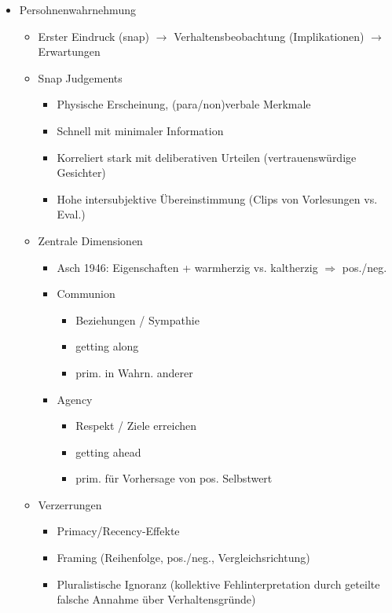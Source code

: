 \documentclass[11pt, paper=a4, twocolumn]{scrartcl}
\begin{document}
\begin{itemize}
			\item Persohnenwahrnehmung
				\begin{itemize}
					\item Erster Eindruck (snap) $\rightarrow$ Verhaltensbeobachtung (Implikationen) $\rightarrow$ Erwartungen
					\item Snap Judgements
						\begin{itemize}
							\item Physische Erscheinung, (para/non)verbale Merkmale
							\item Schnell mit minimaler Information
							\item Korreliert stark mit deliberativen Urteilen (vertrauenswürdige Gesichter)
							\item Hohe intersubjektive Übereinstimmung (Clips von Vorlesungen vs. Eval.)
						\end{itemize}
					\item Zentrale Dimensionen
						\begin{itemize}
							\item Asch 1946: Eigenschaften + warmherzig vs. kaltherzig $\Rightarrow$ pos./neg.
							\item Communion
								\begin{itemize}
									\item Beziehungen / Sympathie
									\item getting along
									\item prim. in Wahrn. anderer
								\end{itemize}
							\item Agency
								\begin{itemize}
									\item Respekt / Ziele erreichen
									\item getting ahead
									\item prim. für Vorhersage von pos. Selbstwert
								\end{itemize}
						\end{itemize}
					\item Verzerrungen
						\begin{itemize}
							\item Primacy/Recency-Effekte
							\item Framing (Reihenfolge, pos./neg., Vergleichsrichtung)
							\item Pluralistische Ignoranz (kollektive Fehlinterpretation durch geteilte falsche Annahme über 
								Verhaltensgründe)\\

\end{itemize}
\end{itemize}
\end{itemize}
\end{document}
